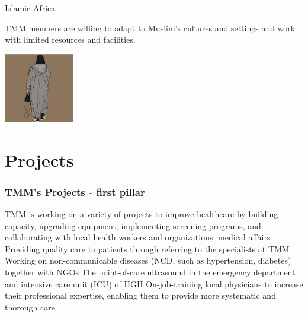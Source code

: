 \documentclass[aspectratio=169]{beamer}
\begin{document}
\begin{frame}{Islamic Africa}

\begin{outline}
    \1 TMM members are willing to adapt to Muslim's cultures and settings and work with limited resources and facilities.

\end{outline}

\begin{center}
\includegraphics[width=0.23\textwidth]{IMG_4872.jpeg}


%
%
\end{center}

\end{frame}
\section{Projects}
\begin{frame}
\frametitle{TMM's Projects - first pillar}
\begin{outline}
    TMM is working on a variety of projects to improve healthcare by building capacity, upgrading equipment, implementing screening programs, and collaborating with local health workers and organizations.
    \1 medical affairs
        \2 Providing quality care to patients through referring to the specialists at TMM
        \2 Working on non-communicable diseases (NCD, such as hypertension, diabetes) together with NGOs
        \2 The point-of-care ultrasound in the emergency department and intensive care unit (ICU) of HGH
        \2 On-job-training local physicians to increase their professional expertise, enabling them to provide more systematic and thorough care.
\end{outline}



\end{frame}
\end{document}
